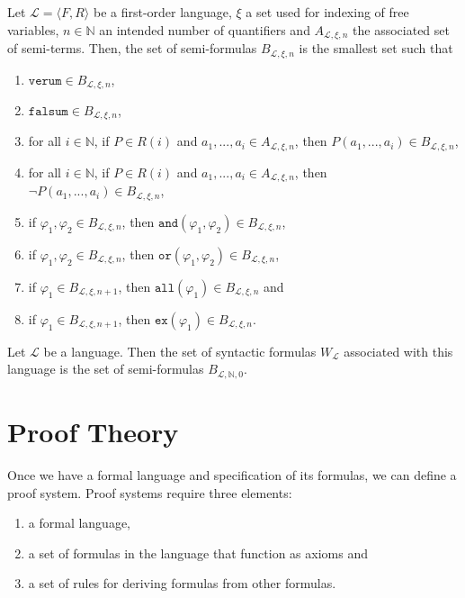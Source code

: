 \begin{definition}\label{def:sem-f}
    \leanok
    Let $\mathcal{L} = \langle F, R \rangle$ be a first-order language, $\xi$ a set used for indexing of free variables, $n \in \mathbb{N}$ an intended number of quantifiers and $A_{\mathcal{L},\xi,n}$ the associated set of semi-terms. Then, the set of semi-formulas $B_{\mathcal{L},\xi,n}$ is the smallest set such that 
    \begin{enumerate}
        \item $\texttt{verum} \in B_{\mathcal{L},\xi,n}$,
        \item $\texttt{falsum} \in B_{\mathcal{L},\xi,n}$,
        \item for all $i \in \mathbb{N}$, if $P \in R(i)$ and $a_1,...,a_i \in A_{\mathcal{L},\xi,n}$, then $P(a_1,...,a_i) \in B_{\mathcal{L},\xi,n}$,
        \item for all $i \in \mathbb{N}$, if $P \in R(i)$ and $a_1,...,a_i \in A_{\mathcal{L},\xi,n}$, then $\neg P(a_1,...,a_i) \in B_{\mathcal{L},\xi,n}$,
        \item if $\varphi_1,\varphi_2 \in B_{\mathcal{L},\xi,n}$, then $\texttt{and}(\varphi_1,\varphi_2) \in B_{\mathcal{L},\xi,n}$,
        \item if $\varphi_1,\varphi_2 \in B_{\mathcal{L},\xi,n}$, then $\texttt{or}(\varphi_1,\varphi_2) \in B_{\mathcal{L},\xi,n}$,
        \item if $\varphi_1 \in B_{\mathcal{L},\xi,n+1}$, then $\texttt{all}(\varphi_1) \in B_{\mathcal{L},\xi,n}$ and
        \item if $\varphi_1 \in B_{\mathcal{L},\xi,n+1}$, then $\texttt{ex}(\varphi_1) \in B_{\mathcal{L},\xi,n}$.
    \end{enumerate}
\end{definition}

\begin{definition}\label{def:syn-f}
    \leanok
    Let $\mathcal{L}$ be a language. Then the set of syntactic formulas $W_{\mathcal{L}}$ associated with this language is the set of semi-formulas $B_{\mathcal{L},\mathbb{N},0}$.
\end{definition}

\section{Proof Theory}
Once we have a formal language and specification of its formulas, we can define a proof system. Proof systems require three elements:
\begin{enumerate}
    \item a formal language,
    \item a set of formulas in the language that function as axioms and
    \item a set of rules for deriving formulas from other formulas.
\end{enumerate}    

